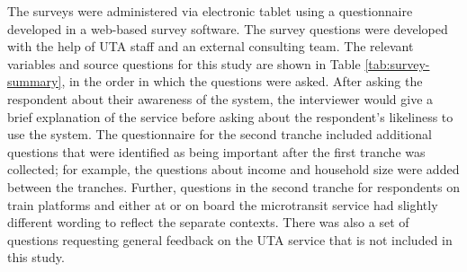 \documentclass[smartcities,article,submit,moreauthors,pdftex]{Definitions/mdpi}
\begin{document}
The surveys were administered via electronic tablet using a questionnaire developed in a web-based survey software. The survey questions were developed with the help of UTA staff and an external consulting team. The relevant variables and source questions for this study are shown in Table \ref{tab:survey-summary}, in the order in which the questions were asked. After asking the respondent about their awareness of the system, the interviewer would give a brief explanation of the service before asking about the respondent’s likeliness to use the system. The questionnaire for the second tranche included additional questions that were identified as being important after the first tranche was collected; for example, the questions about income and household size were added between the tranches. Further, questions in the second tranche for respondents on train platforms and either at or on board the microtransit service had slightly different wording to reflect the separate contexts. There was also a set of questions requesting general feedback on the UTA service that is not included in this study.
\end{document}
